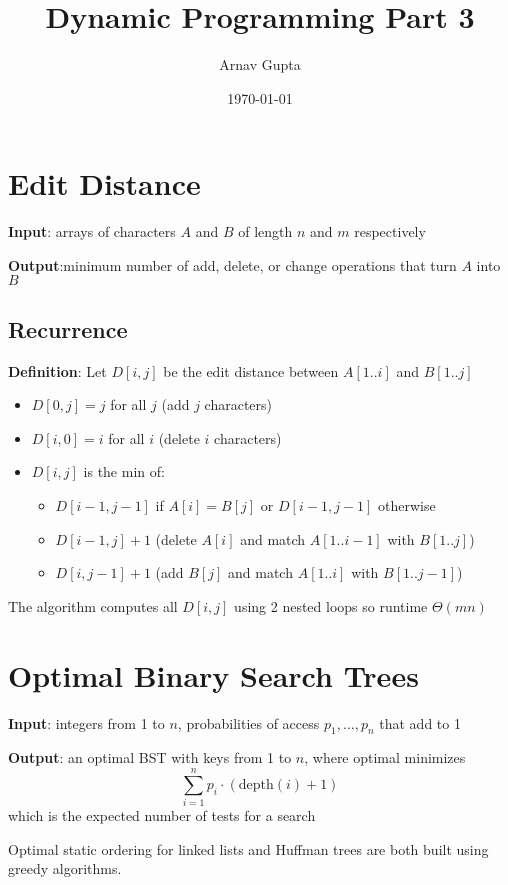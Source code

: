 \documentclass[11pt]{article}
\author{Arnav Gupta}
\date{\today}
\title{Dynamic Programming Part 3}
\begin{document}
\maketitle
\tableofcontents

\section{Edit Distance}
\label{sec:orge977afa}
\textbf{Input}: arrays of characters \(A\) and \(B\) of length \(n\) and \(m\) respectively

\textbf{Output}:minimum number of add, delete, or change operations that turn \(A\) into \(B\)
\subsection{Recurrence}
\label{sec:orgfa7fdbf}
\textbf{Definition}: Let \(D[i, j]\) be the edit distance between \(A[1..i]\) and \(B[1..j]\)
\begin{itemize}
\item \(D[0, j] = j\) for all \(j\) (add \(j\) characters)
\item \(D[i, 0] = i\) for all \(i\) (delete \(i\) characters)
\item \(D[i, j]\) is the min of:
\begin{itemize}
\item \(D[i-1, j-1]\) if \(A[i] = B[j]\) or \(D[i-1, j-1]\) otherwise
\item \(D[i-1, j] + 1\) (delete \(A[i]\) and match \(A[1..i-1]\) with \(B[1..j]\))
\item \(D[i, j-1] + 1\) (add \(B[j]\) and match \(A[1..i]\) with \(B[1..j-1]\))
\end{itemize}
\end{itemize}

The algorithm computes all \(D[i, j]\) using 2 nested loops so runtime \(\Theta(mn)\)
\section{Optimal Binary Search Trees}
\label{sec:orge01499c}
\textbf{Input}: integers from 1 to \(n\), probabilities of access \(p_{1}, \dots, p_{n}\) that add to 1

\textbf{Output}: an optimal BST with keys from 1 to \(n\), where optimal minimizes
$$
\sum_{i=1}^{n} p_{i} \cdot (\text{depth}(i) + 1)
$$
which is the expected number of tests for a search

Optimal static ordering for linked lists and Huffman trees are both built using
greedy algorithms.
\end{document}
